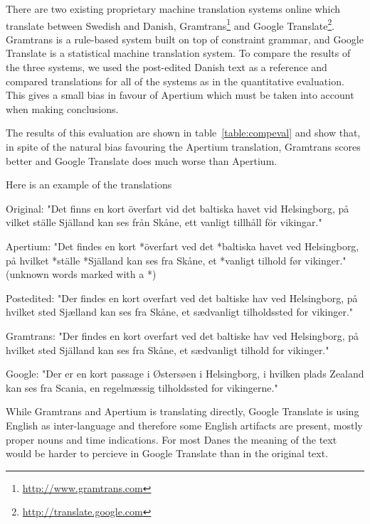 \documentclass[11pt]{article}
\begin{document}
There are two existing proprietary machine translation systems online which translate 
between Swedish and Danish, Gramtrans\footnote{\url{http://www.gramtrans.com}} and Google
Translate\footnote{\url{http://translate.google.com}}. Gramtrans is a rule-based system
built on top of constraint grammar, and Google Translate is a statistical machine translation
system. To compare the results of the three systems, we used the post-edited Danish text as a
reference and compared translations for all of the systems as in the quantitative evaluation.
This gives a small bias in favour of Apertium which must be taken into account when making conclusions.


The results of this evaluation are shown in table~\ref{table:compeval} and show that, in spite 
of the natural bias favouring the Apertium translation, Gramtrans scores better and Google 
Translate does much worse than Apertium.

Here is an example of the translations

Original:
"Det finns en kort överfart vid det baltiska havet vid Helsingborg, 
på vilket ställe Själland kan ses från Skåne, ett vanligt tillhåll för vikingar."

Apertium:
"Det findes en kort *överfart ved det *baltiska havet ved Helsingborg, 
på hvilket *ställe *Själland kan ses fra Skåne, et *vanligt tilhold før vikinger."
(unknown words marked with a *)

Postedited:
"Der findes en kort overfart ved det baltiske hav ved Helsingborg, 
på hvilket sted Sjælland kan ses fra Skåne, et sædvanligt tilholdssted for vikinger."

Gramtrans:
"Der findes en kort overfart ved det baltiske hav ved Helsingborg, 
på hvilket sted Själland kan ses fra Skåne, et sædvanligt tilhold for vikinger."

Google:
"Der er en kort passage i Østersøen i Helsingborg, i hvilken plads 
Zealand kan ses fra Scania, en regelmæssig tilholdssted for vikingerne."

While Gramtrans and Apertium is translating directly, Google Translate is using English 
as inter-language and therefore some English artifacts are present, mostly proper nouns and time indications. 
For most Danes the meaning of the text would be harder to percieve in Google Translate than in the original text.
\end{document}
